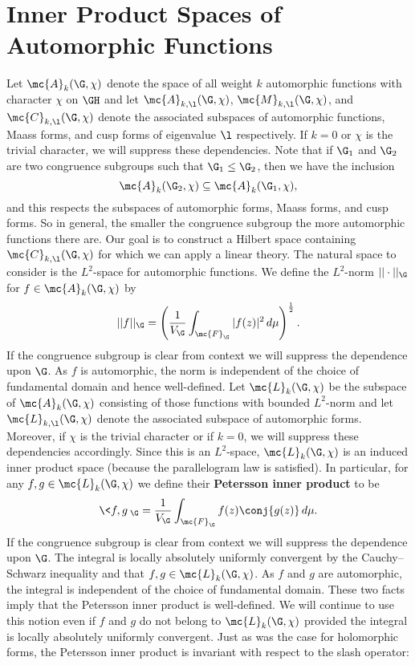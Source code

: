   \section{Inner Product Spaces of Automorphic Functions}
    Let $\mc{A}_{k}(\G,\chi)$ denote the space of all weight $k$ automorphic functions with character $\chi$ on $\GH$ and let $\mc{A}_{k,\l}(\G,\chi)$, $\mc{M}_{k,\l}(\G,\chi)$, and $\mc{C}_{k,\l}(\G,\chi)$ denote the associated subspaces of automorphic functions, Maass forms, and cusp forms of eigenvalue $\l$ respectively. If $k = 0$ or $\chi$ is the trivial character, we will suppress these dependencies. Note that if $\G_{1}$ and $\G_{2}$ are two congruence subgroups such that $\G_{1} \le \G_{2}$, then we have the inclusion
    \[
      \mc{A}_{k}(\G_{2},\chi) \subseteq \mc{A}_{k}(\G_{1},\chi),
    \]
    and this respects the subspaces of automorphic forms, Maass forms, and cusp forms. So in general, the smaller the congruence subgroup the more automorphic functions there are. Our goal is to construct a Hilbert space containing $\mc{C}_{k,\l}(\G,\chi)$ for which we can apply a linear theory. The natural space to consider is the $L^{2}$-space for automorphic functions. We define the $L^{2}$-norm $||\cdot||_{\G}$ for $f \in \mc{A}_{k}(\G,\chi)$ by 
    \[
      ||f||_{\G} = \left(\frac{1}{V_{\G}}\int_{\mc{F}_{\G}}|f(z)|^{2}\,d\mu\right)^{\frac{1}{2}}.
    \]
    If the congruence subgroup is clear from context we will suppress the dependence upon $\G$. As $f$ is automorphic, the norm is independent of the choice of fundamental domain and hence well-defined. Let $\mc{L}_{k}(\G,\chi)$ be the subspace of $\mc{A}_{k}(\G,\chi)$ consisting of those functions with bounded $L^{2}$-norm and let $\mc{L}_{k,\l}(\G,\chi)$ denote the associated subspace of automorphic forms. Moreover, if $\chi$ is the trivial character or if $k = 0$, we will suppress these dependencies accordingly. Since this is an $L^{2}$-space, $\mc{L}_{k}(\G,\chi)$ is an induced inner product space (because the parallelogram law is satisfied). In particular, for any $f,g \in \mc{L}_{k}(\G,\chi)$ we define their \textbf{Petersson inner product} to be
    \[
      \<f,g\>_{\G} = \frac{1}{V_{\G}}\int_{\mc{F}_{\G}}f(z)\conj{g(z)}\,d\mu.
    \]
    If the congruence subgroup is clear from context we will suppress the dependence upon $\G$. The integral is locally absolutely uniformly convergent by the Cauchy–Schwarz inequality and that $f,g \in \mc{L}_{k}(\G,\chi)$. As $f$ and $g$ are automorphic, the integral is independent of the choice of fundamental domain. These two facts imply that the Petersson inner product is well-defined. We will continue to use this notion even if $f$ and $g$ do not belong to $\mc{L}_{k}(\G,\chi)$ provided the integral is locally absolutely uniformly convergent. Just as was the case for holomorphic forms, the Petersson inner product is invariant with respect to the slash operator:

